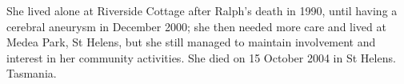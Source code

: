 She lived alone at Riverside Cottage after Ralph's death in 1990, until having a cerebral aneurysm in December 2000; she then needed more care and lived at Medea Park, St Helens, but she still managed to maintain involvement and interest in her community activities.  She  died on 15 October 2004 in St Helens. Tasmania.
